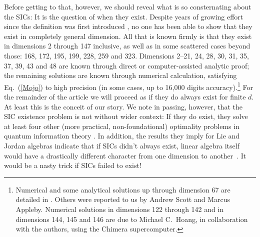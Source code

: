 \documentclass[aps,pra,superscriptaddress,12pt,tightenlines,nofootinbib]{revtex4-2}
\begin{document}
Before getting to that, however, we should reveal what is so consternating about the SICs: It is the question of when they exist.  Despite years of growing effort since the definition was first introduced \cite{Zauner99,Caves99,Renes04}, no one has been able to show that they exist in completely general dimension.  All that is known firmly is that they exist in dimensions 2 through 147 inclusive, as well as in some scattered cases beyond those: 168, 172, 195, 199, 228, 259 and
323.  Dimensions 2--21, 24, 28, 30, 31, 35, 37, 39, 43 and 48 are known through direct or computer-assisted analytic proof; the remaining solutions are known through numerical calculation, satisfying Eq.~(\ref{Mojo}) to high precision (in some cases, up to 16,000 digits accuracy).\footnote{Numerical and some analytical solutions up through dimension 67 are detailed in \cite{Scott09}.  Others were reported to us by Andrew Scott and Marcus Appleby. Numerical solutions in dimensions 122 through 142 and in dimensions 144, 145 and 146 are due to Michael C.\ Hoang, in collaboration with the authors, using the Chimera supercomputer.}  For the remainder of the article we will proceed as if they do always exist for finite $d$.    At least this is the conceit of our story.  We note in passing, however, that the SIC existence problem is not without wider context:  If they do exist, they solve at least four other (more practical, non-foundational) optimality problems in quantum information theory \cite{Fuchs03,Scott06,Appleby07,Wootters07,Zhu2016}.  In addition, the results they imply for Lie and Jordan algebras indicate that if SICs didn't always exist, linear algebra itself would have a drastically different character from one dimension to another~\cite{Appleby15}.  It would be a nasty trick if SICs failed to exist!
\end{document}
